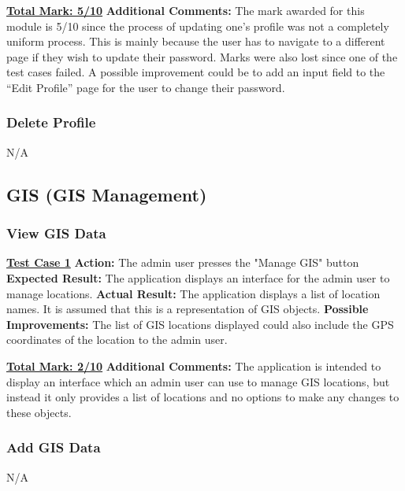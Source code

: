 \documentclass[english]{article}
\begin{document}
\textbf{\underline{Total Mark: 5/10}}\newline
\textbf{Additional Comments:} The mark awarded for this module is 5/10 since the process of updating one’s profile was not a completely uniform process. This is mainly because the user has to navigate to a different page if they wish to update their password. Marks were also lost since one of the test cases failed. A possible improvement could be to add an input field to the “Edit Profile” page for the user to change their password. \newline

\subsubsection{Delete Profile}
N/A

\subsection{GIS (GIS Management)}

\subsubsection{View GIS Data}
\textbf{\underline{Test Case 1}}\newline
\textbf{Action:} The admin user presses the "Manage GIS" button\newline
\textbf{Expected Result:} The application displays an interface for the admin user to manage locations.\newline
\textbf{Actual Result:} The application displays a list of location names. It is assumed that this is a representation of GIS objects.\newline
\textbf{Possible Improvements:} The list of GIS locations displayed could also include the GPS coordinates of the location to the admin user.\newline

\textbf{\underline{Total Mark: 2/10}}\newline
\textbf{Additional Comments:} The application is intended to display an interface which an admin user can use to manage GIS locations, but instead it only provides a list of locations and no options to make any changes to these objects. \newline

\subsubsection{Add GIS Data}
N/A
\end{document}
